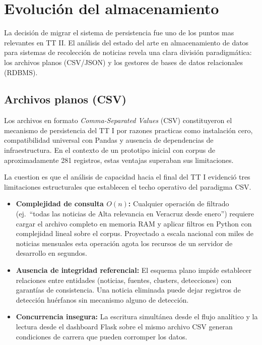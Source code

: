 \section{Evolución del almacenamiento}
\label{sec:ea_almacenamiento}

La decisión de migrar el sistema de persistencia fue uno de los puntos mas
relevantes en  TT II. El análisis del estado del arte en almacenamiento de datos
para sistemas de recolección de noticias revela una clara división paradigmática:
los archivos planos (CSV/JSON) y los gestores de bases de datos relacionales (RDBMS).

\subsection{Archivos planos (CSV)}
\label{subsec:ea_csv}

Los archivos en formato \textit{Comma-Separated Values} (CSV) constituyeron el
mecanismo de persistencia del TT I por razones practicas como instalación cero,
compatibilidad universal con Pandas y ausencia de dependencias de infraestructura.
En el contexto de un prototipo inicial con corpus de aproximadamente 281
registros, estas ventajas superaban sus limitaciones.

La cuestion es que el análisis de capacidad hacia el final del TT I evidenció tres
limitaciones estructurales que establecen el techo operativo del paradigma CSV.

\begin{itemize}
    \item \textbf{Complejidad de consulta $O(n)$:} Cualquier operación de filtrado
          (ej.\ ``todas las noticias de Alta relevancia en Veracruz desde enero'')
          requiere cargar el archivo completo en memoria RAM y aplicar filtros en
          Python con complejidad lineal sobre el corpus. Proyectado a escala
          nacional con miles de noticias mensuales  esta operación agota los
          recursos de un servidor de desarrollo en segundos.

    \item \textbf{Ausencia de integridad referencial:} El esquema plano impide
          establecer relaciones entre entidades (noticias, fuentes, clusters,
          detecciones) con garantías de consistencia. Una noticia eliminada puede
          dejar registros de detección huérfanos sin mecanismo alguno de detección.

    \item \textbf{Concurrencia insegura:} La escritura simultánea desde el flujo
          analítico y la lectura desde el dashboard Flask sobre el mismo archivo CSV
          generan condiciones de carrera que pueden corromper los datos.
\end{itemize}

